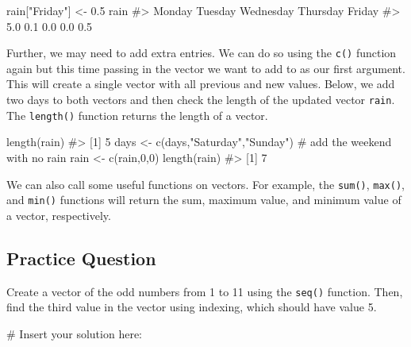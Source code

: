 \documentclass[
  letterpaper,
]{krantz}
\makeatletter
\newenvironment{Shaded}{\begin{snugshade}}{\end{snugshade}}
\newcommand{\CommentTok}[1]{\textcolor[rgb]{0.37,0.37,0.37}{#1}}
\newcommand{\DecValTok}[1]{\textcolor[rgb]{0.68,0.00,0.00}{#1}}
\newcommand{\FloatTok}[1]{\textcolor[rgb]{0.68,0.00,0.00}{#1}}
\newcommand{\FunctionTok}[1]{\textcolor[rgb]{0.28,0.35,0.67}{#1}}
\newcommand{\NormalTok}[1]{\textcolor[rgb]{0.00,0.23,0.31}{#1}}
\newcommand{\OtherTok}[1]{\textcolor[rgb]{0.00,0.23,0.31}{#1}}
\newcommand{\StringTok}[1]{\textcolor[rgb]{0.13,0.47,0.30}{#1}}
\newenvironment{kframe}{%
\medskip{}
\setlength{\fboxsep}{.8em}
 \def\at@end@of@kframe{}%
 \ifinner\ifhmode%
  \def\at@end@of@kframe{\end{minipage}}%
  \begin{minipage}{\columnwidth}%
 \fi\fi%
 \def\FrameCommand##1{\hskip\@totalleftmargin \hskip-\fboxsep
 \colorbox{shadecolor}{##1}\hskip-\fboxsep
     \hskip-\linewidth \hskip-\@totalleftmargin \hskip\columnwidth}%
 \MakeFramed {\advance\hsize-\width
   \@totalleftmargin\z@ \linewidth\hsize
   \@setminipage}}%
 {\par\unskip\endMakeFramed%
 \at@end@of@kframe}
\renewenvironment{Shaded}{\begin{kframe}}{\end{kframe}}
\makeatother
\begin{document}
\begin{Shaded}
\begin{Highlighting}[]
\NormalTok{rain[}\StringTok{"Friday"}\NormalTok{] }\OtherTok{\textless{}{-}} \FloatTok{0.5}
\NormalTok{rain}
\CommentTok{\#\textgreater{}    Monday   Tuesday Wednesday  Thursday    Friday }
\CommentTok{\#\textgreater{}       5.0       0.1       0.0       0.0       0.5}
\end{Highlighting}
\end{Shaded}

Further, we may need to add extra entries. We can do so using the
\texttt{c()} function again but this time passing in the vector we want
to add to as our first argument. This will create a single vector with
all previous and new values. Below, we add two days to both vectors and
then check the length of the updated vector \texttt{rain}. The
\texttt{length()} function returns the length of a vector.

\begin{Shaded}
\begin{Highlighting}[]
\FunctionTok{length}\NormalTok{(rain)}
\CommentTok{\#\textgreater{} [1] 5}
\NormalTok{days }\OtherTok{\textless{}{-}} \FunctionTok{c}\NormalTok{(days,}\StringTok{"Saturday"}\NormalTok{,}\StringTok{"Sunday"}\NormalTok{) }\CommentTok{\# add the weekend with no rain}
\NormalTok{rain }\OtherTok{\textless{}{-}} \FunctionTok{c}\NormalTok{(rain,}\DecValTok{0}\NormalTok{,}\DecValTok{0}\NormalTok{)}
\FunctionTok{length}\NormalTok{(rain)}
\CommentTok{\#\textgreater{} [1] 7}
\end{Highlighting}
\end{Shaded}

We can also call some useful functions on vectors. For example, the
\texttt{sum()}, \texttt{max()}, and \texttt{min()} functions will return
the sum, maximum value, and minimum value of a vector, respectively.

\subsection{Practice Question}\label{practice-question}

Create a vector of the odd numbers from 1 to 11 using the \texttt{seq()}
function. Then, find the third value in the vector using indexing, which
should have value 5.

\begin{Shaded}
\begin{Highlighting}[]
\CommentTok{\# Insert your solution here:}
\end{Highlighting}
\end{Shaded}
\end{document}
